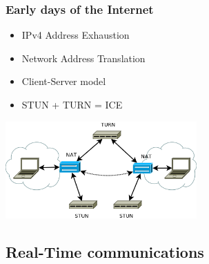 \documentclass[compress]{beamer}
\begin{document}
  		\begin{frame}[c]
		\frametitle{Early days of the Internet}
		\begin{itemize}
		\item IPv4 Address Exhaustion
		\vfill
		\item Network Address Translation	
		\vfill
		\item Client-Server model
		\vfill
		\item STUN + TURN = ICE
		\end{itemize}
		\begin{flushright}

			\vspace*{-8\baselineskip}
			\includegraphics[width=0.55\textwidth]{figures/ice.png}
		\end{flushright}
		
		\end{frame}




	\subsection{Real-Time communications}\label{rtc}
\end{document}
